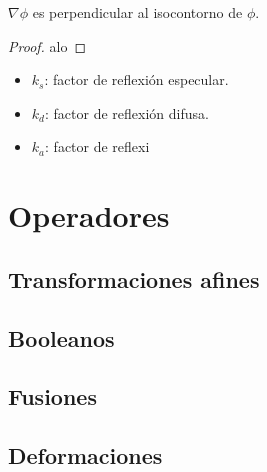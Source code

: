 \begin{proposicion}
    $\nabla\phi$ es perpendicular al isocontorno de $\phi$.
\end{proposicion}
\begin{proof}
    alo
\end{proof}

\begin{itemize}
    \item $k_s$: factor de reflexión especular.
    \item $k_d$: factor de reflexión difusa.
    \item $k_a$: factor de reflexi
\end{itemize}
\section{Operadores}
\subsection{Transformaciones afines}
\subsection{Booleanos}
\subsection{Fusiones}
\subsection{Deformaciones}